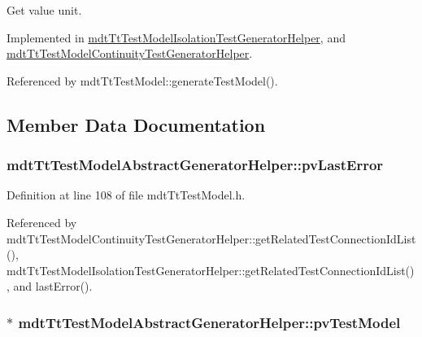 Get value unit. 



Implemented in \hyperlink{classmdt_tt_test_model_isolation_test_generator_helper_a7d55e02fef9b1714da4f272c4dd11d3c}{mdt\-Tt\-Test\-Model\-Isolation\-Test\-Generator\-Helper}, and \hyperlink{classmdt_tt_test_model_continuity_test_generator_helper_a6138f713bd16f772f1378442c071023f}{mdt\-Tt\-Test\-Model\-Continuity\-Test\-Generator\-Helper}.



Referenced by mdt\-Tt\-Test\-Model\-::generate\-Test\-Model().



\subsection{Member Data Documentation}
\hypertarget{classmdt_tt_test_model_abstract_generator_helper_a23596c4147cc4ab18d6fb71da6db7a18}{
\subsubsection[{pv\-Last\-Error}]{ mdt\-Tt\-Test\-Model\-Abstract\-Generator\-Helper\-::pv\-Last\-Error\hspace{0.3cm}{\ttfamily [protected]}}}\label{classmdt_tt_test_model_abstract_generator_helper_a23596c4147cc4ab18d6fb71da6db7a18}


Definition at line 108 of file mdt\-Tt\-Test\-Model.\-h.



Referenced by mdt\-Tt\-Test\-Model\-Continuity\-Test\-Generator\-Helper\-::get\-Related\-Test\-Connection\-Id\-List(), mdt\-Tt\-Test\-Model\-Isolation\-Test\-Generator\-Helper\-::get\-Related\-Test\-Connection\-Id\-List(), and last\-Error().

\hypertarget{classmdt_tt_test_model_abstract_generator_helper_a821fab46c2c201b22f180d4b4b47cd36}{
\subsubsection[{pv\-Test\-Model}]{$\ast$ mdt\-Tt\-Test\-Model\-Abstract\-Generator\-Helper\-::pv\-Test\-Model\hspace{0.3cm}{\ttfamily [protected]}}}\label{classmdt_tt_test_model_abstract_generator_helper_a821fab46c2c201b22f180d4b4b47cd36}


